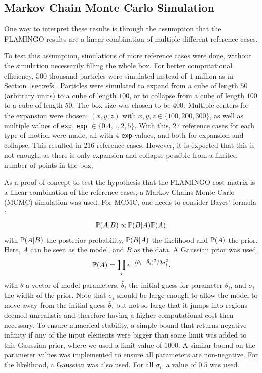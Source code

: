 \subsection{Markov Chain Monte Carlo Simulation} 
One way to interpret these results is through the assumption that the FLAMINGO results are a linear combination of multiple different reference cases. \par 
To test this assumption, simulations of more reference cases were done, without the simulation necessarily filling the whole box. For better computational efficiency, $500$ thousand particles were simulated instead of $1$ million as in Section~\ref{sec:refs}. Particles were simulated to expand from a cube of length $50$ (arbitrary units) to a cube of length $100$, or to collapse from a cube of length $100$ to a cube of length $50$. The box size was chosen to be $400$. Multiple centers for the expansion were chosen: $(x, y, z)$ with $x, y, z \in \{100, 200, 300\}$, as well as multiple values of \lstinline|exp|, \lstinline|exp| $\in \{0.4, 1, 2, 5\}$. With this, $27$ reference cases for each type of motion were made, all with $4$ \lstinline|exp| values, and both for expansion and collapse. This resulted in 216 reference cases. However, it is expected that this is not enough, as there is only expansion and collapse possible from a limited number of points in the box. \par 
As a proof of concept to test the hypothesis that the FLAMINGO cost matrix is a linear combination of the reference cases, a Markov Chains Monte Carlo (MCMC) simulation was used. For MCMC, one needs to consider Bayes' formula \citep{grimmett2014}: 
\begin{equation}
	\P(A|B) \propto \P(B|A) \P(A),
\end{equation}
with $\P(A|B)$ the posterior probability, $\P(B|A)$ the likelihood and $\P(A)$ the prior. Here, $A$ can be seen as the model, and $B$ as the data. A Gaussian prior was used, 
\begin{equation}
	\P(A) = \prod_i e^{-(\theta_i - \hat{\theta}_i)^2/2\sigma_i^2},
\end{equation}
with $\theta$ a vector of model parameters, $\hat{\theta}_i$ the initial guess for parameter $\theta_i$, and $\sigma_i$ the width of the prior. Note that $\sigma_i$ should be large enough to allow the model to move away from the initial guess $\hat{\theta}$, but not so large that it jumps into regions deemed unrealistic and therefore having a higher computational cost then necessary. To ensure numerical stability, a simple bound that returns negative infinity if any of the input elements were bigger than some limit was added to this Gaussian prior, where we used a limit value of $1000$. A similar bound on the parameter values was implemented to ensure all parameters are non-negative. For the likelihood, a Gaussian was also used. For all $\sigma_i$, a value of $0.5$ was used. \par 
